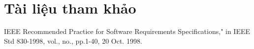 \section{Tài liệu tham khảo}
IEEE Recommended Practice for Software Requirements Specifications," in IEEE Std 830-1998, vol., no., pp.1-40, 20 Oct. 1998.